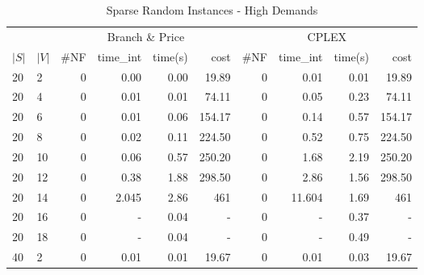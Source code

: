 \begin{appendices}
\begin{table*}[h]
\scriptsize
\begin{center}
\caption{Sparse Random Instances - High Demands}
\begin{tabular} {l l | r r r r | r r r r}
\hline
       &                                 &  \multicolumn{4}{c|}{Branch \& Price}                                & \multicolumn{4}{c}{CPLEX}                 \\
 $|S|$ & $|V|$                           &  \#NF  & time\_int     &  time(s)      &  cost            &  \#NF   &  time\_int   &  time(s)       &  cost       \\ 
 \hline       
20 & 2                                  &   0             & 0.00          &  0.00       &  19.89       &  0            &  0.01    &  0.01       &  19.89            \\ 
20 & 4                                  &   0             & 0.01          &  0.01       &  74.11       &  0            &  0.05    &  0.23       &  74.11            \\ 
20 & 6                                  &   0             & 0.01          &  0.06       &  154.17      &  0            &  0.14    &  0.57       &  154.17           \\ 
20 & 8                                  &   0             & 0.02          &  0.11       &  224.50      &  0            &  0.52    &  0.75       &  224.50           \\ 
20 & 10                                 &   0             & 0.06          &  0.57       &  250.20      &  0            &  1.68    &  2.19       &  250.20           \\ 
20 & 12                                 &   0             & 0.38          &  1.88       &  298.50      &  0            &  2.86    &  1.56       &  298.50           \\ 
20 & 14                                 &   0             & 2.045         &  2.86       &  461         &  0            &  11.604  &  1.69       &  461              \\ 
20 & 16                                 &   0             & -             &  0.04       &  -           &  0            &  -       &  0.37       &  -                \\ 
20 & 18                                 &   0             & -             &  0.04       &  -           &  0            &  -       &  0.49       &  -                \\ 
40 & 2                                  &   0             & 0.01          &  0.01       &  19.67       &  0            &  0.01    &  0.03       &  19.67            \\ 

\end{tabular}
\end{center}
\end{table*}
\end{appendices}
